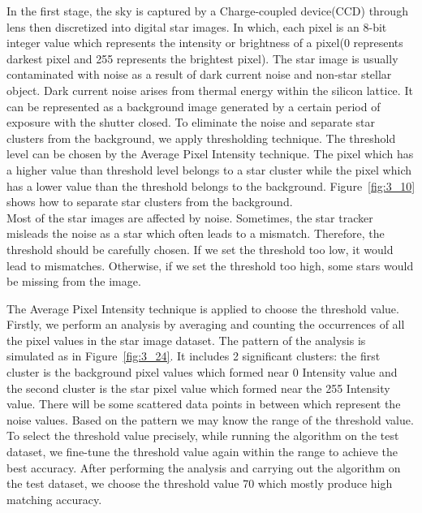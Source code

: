 In the first stage, the sky is captured by a Charge-coupled device(CCD) through lens then discretized into digital star images. In which, each pixel is an 8-bit integer value which represents the intensity or brightness of a pixel(0 represents darkest pixel and 255 represents the brightest pixel). The star image is usually contaminated with noise as a result of dark current noise and non-star stellar object. Dark current noise arises from thermal energy within the silicon lattice. It can be represented as a background image generated by a certain period of exposure with the shutter closed\cite{MDP}. To eliminate the noise and separate star clusters from the background, we apply thresholding technique. The threshold level can be chosen by the Average Pixel Intensity technique. The pixel which has a higher value than threshold level belongs to a star cluster while the pixel which has a lower value than the threshold belongs to the background. Figure~\ref{fig:3_10} shows how to separate star clusters from the background. \\

\noindent Most of the star images are affected by noise. Sometimes, the star tracker misleads the noise as a star which often leads to a mismatch. Therefore, the threshold should be carefully chosen. If we set the threshold too low, it would lead to mismatches. Otherwise, if we set the threshold too high, some stars would be missing from the image. 


\noindent The Average Pixel Intensity technique is applied to choose the threshold value. Firstly, we perform an analysis by averaging and counting the occurrences of all the pixel values in the star image dataset. The pattern of the analysis is simulated as in Figure~\ref{fig:3_24}. It includes 2 significant clusters: the first cluster is the background pixel values which formed near 0 Intensity value and the second cluster is the star pixel value which formed near the 255 Intensity value. There will be some scattered data points in between which represent the noise values. Based on the pattern we may know the range of the threshold value. To select the threshold value precisely, while running the algorithm on the test dataset, we fine-tune the threshold value again within the range to achieve the best accuracy. After performing the analysis and carrying out the algorithm on the test dataset, we choose the threshold value 70 which mostly produce high matching accuracy. \\

